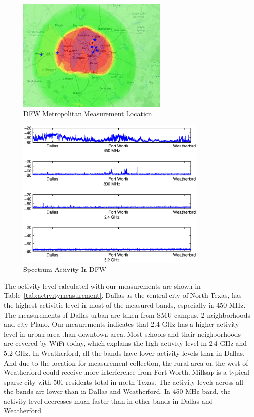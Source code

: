 \begin{figure}
\centering
\includegraphics[width=74mm]{figures/drivemap}
\vspace{-0.1in}
\caption{DFW Metropolitan Measurement Location}                                                                 
\label{fig:drivemap}
\vspace{-0.1in}
\end{figure}
   
\begin{figure}
\centering
\includegraphics[width=94mm]{figures/drivetest}
\vspace{-0.1in}
\caption{Spectrum Activity In DFW}                                                                 
\label{fig:drivetest}
\vspace{-0.1in}
\end{figure}

The activity level calculated with our measurements are shown in Table~\ref{tab:activitymeasurement}.
Dallas as the central city of North Texas, has the highest activitie level in most of the measured bands,
especially in 450 MHz. The measurements of Dallas urban are taken from SMU campus, 2 neighborhoods
and city Plano. Our meaurements indicates that 2.4 GHz has a higher activity level in urban area than 
downtown area. Most schools and their neighborhoods are covered by WiFi today,
which explains the high activity level in 2.4 GHz and 5.2 GHz.
In Weatherford, all the bands have lower activity levels than in Dallas. And due to the location for 
measurement collection, the rural area on the west of Weatherford could receive more 
interference from Fort Worth.
Millsap is a typical sparse city with 500 residents total in north Texas. The activity levels across 
all the bands are lower than in Dallas and Weatherford. In 450 MHz band, the activity level decreases 
much faster than in other bands in Dallas and Weatherford. 



